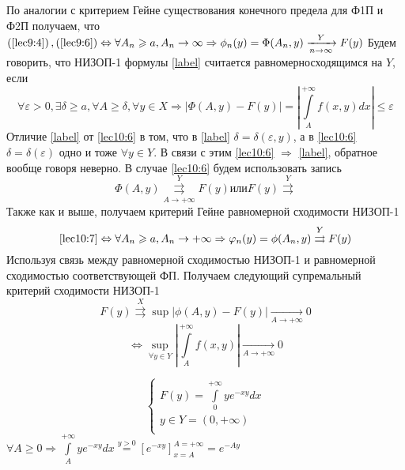 \documentclass[a4paper,12pt,openany]{report}
\begin{document}
По аналогии с критерием Гейне существования конечного предела для Ф1П и Ф2П получаем, что 
$\left(\eqref{lec9:4}\right),\left(\eqref{lec9:6}\right) \Leftrightarrow \forall A_n \ge a, A_n \to \infty \Rightarrow \phi_n(y) =\Phi(A_n,y) \xrightarrow[n\rightarrow \infty]{Y}F(y) $
Будем говорить, что НИЗОП-1 формулы \eqref{label}  считается равномерносходящимся на $Y$, если
\begin{equation}
\label{lec10:6}
\forall \varepsilon > 0, \exists \delta \ge a, \forall A \ge \delta, \forall y\in X \Rightarrow \left| \Phi(A,y) - F(y) \right| = \left| \int\limits_A^{+\infty} f(x,y) dx \right| \le \varepsilon
\end{equation}
Отличие \eqref{label} от \eqref{lec10:6} в том, что в \eqref{label} $\delta = \delta(\varepsilon,y)$, а в \eqref{lec10:6} $\delta = \delta(\varepsilon)$ одно и тоже $\forall y \in Y$. В связи с этим \eqref{lec10:6} $\Rightarrow$ \eqref{label}, обратное вообще говоря неверно. 
В случае \eqref{lec10:6} будем использовать запись \begin{equation}
\label{lec10:7}
\Phi(A,y)\overset{Y}{\underset{A \to +\infty}{\rightrightarrows}}F(y) или F(y)\overset{Y}{\rightrightarrows}
\end{equation}
Также как и выше, получаем критерий Гейне равномерной сходимости НИЗОП-1 \begin{equation}
\label{lec10:8}
 \eqref{lec10:7} \Leftrightarrow \forall A_n \ge a, A_n\rightarrow +\infty \Rightarrow \varphi_n(y) = \phi(A_n,y) \overset{Y}\rightrightarrows F(y) 
\end{equation}
Используя связь между равномерной сходимостью НИЗОП-1 и равномерной сходимостью соответствующей ФП. Получаем следующий супремальный критерий сходимости НИЗОП-1 
\begin{equation}
\label{lec10:9}
F(y)\overset{X} \rightrightarrows \sup\left|\phi(A , y) - F(y) \right| \underset{A \to + \infty}\to 0 \end{equation}
\begin{equation}
\label{lec10:10}\Leftrightarrow \underset{\forall y \in Y}\sup\left|\int\limits_A^{+\infty} f(x,y)\right| \underset{A \to + \infty} \to 0  \end{equation}

$$ \left\{\begin{array}{rcl}
		F(y)=\int\limits_0^{+\infty}ye^{-xy}dx\\
		y \in Y = (0,+\infty)\\
		\end{array}
		\right. $$
$\forall A \ge 0 \Rightarrow \int\limits_A^{+\infty}ye^{-xy}dx \overset{y > 0} = \left[e^{-xy} \right]_{x = A}^{A = +\infty} = e^{-Ay} $
\end{document}
